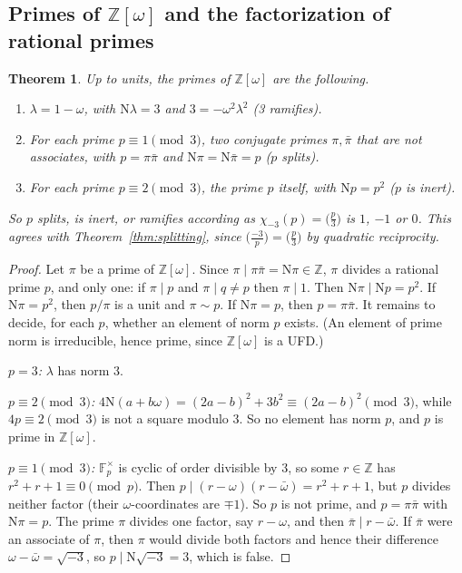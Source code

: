 \documentclass[11pt]{article}
\numberwithin{equation}{section}
\newcommand{\N}{\mathrm N}
\newcommand{\OO}{\mathbb Z[\omega]}
\newcommand{\Z}{\mathbb Z}
\newcommand{\F}{\mathbb F}
\newcommand{\ch}{\chi_{-3}}
\newtheorem{theorem}{Theorem}
\theoremstyle{definition}
\theoremstyle{remark}
\begin{document}
\subsection{Primes of \texorpdfstring{$\OO$}{Z[omega]} and the factorization of rational primes}\label{sec:primes}
\begin{theorem}\label{thm:primes}
Up to units, the primes of $\OO$ are the following.
\begin{enumerate}
\item $\lambda=1-\omega$, with $\N\lambda=3$ and $3=-\omega^2\lambda^2$ \emph{(3 ramifies)}.
\item For each prime $p\equiv1\pmod3$, two conjugate primes $\pi,\bar\pi$ that are not
associates, with $p=\pi\bar\pi$ and $\N\pi=\N\bar\pi=p$ \emph{($p$ splits)}.
\item For each prime $p\equiv2\pmod3$, the prime $p$ itself, with $\N p=p^2$ \emph{($p$ is inert)}.
\end{enumerate}
So $p$ splits, is inert, or ramifies according as $\ch(p)=\bigl(\frac p3\bigr)$ is $1$, $-1$
or $0$. This agrees with Theorem~\ref{thm:splitting}, since $\bigl(\frac{-3}p\bigr)=\bigl(\frac p3\bigr)$
by quadratic reciprocity.
\end{theorem}

\begin{proof}
Let $\pi$ be a prime of $\OO$. Since $\pi\mid\pi\bar\pi=\N\pi\in\Z$, $\pi$ divides a
rational prime $p$, and only one: if $\pi\mid p$ and $\pi\mid q\ne p$ then $\pi\mid1$. Then
$\N\pi\mid\N p=p^2$. If $\N\pi=p^2$, then $p/\pi$ is a unit and $\pi\sim p$. If $\N\pi=p$, then
$p=\pi\bar\pi$. It remains to decide, for each $p$, whether an element of norm $p$ exists.
(An element of prime norm is irreducible, hence prime, since $\OO$ is a UFD.)

\emph{$p=3$:} $\lambda$ has norm $3$.

\emph{$p\equiv2\pmod3$:} $4\N(a+b\omega)=(2a-b)^2+3b^2\equiv(2a-b)^2\pmod3$, while
$4p\equiv2\pmod 3$ is not a square modulo $3$. So no element has norm $p$, and $p$ is prime in $\OO$.

\emph{$p\equiv1\pmod3$:} $\F_p^\times$ is cyclic of order divisible by $3$, so some $r\in\Z$
has $r^2+r+1\equiv0\pmod p$. Then $p\mid(r-\omega)(r-\bar\omega)=r^2+r+1$, but $p$ divides
neither factor (their $\omega$-coordinates are $\mp1$). So $p$ is not prime, and $p=\pi\bar\pi$ with
$\N\pi=p$. The prime $\pi$ divides one factor, say $r-\omega$, and then $\bar\pi\mid r-\bar\omega$.
If $\bar\pi$ were an associate of $\pi$, then $\pi$ would divide both factors and hence
their difference $\omega-\bar\omega=\sqrt{-3}$, so $p\mid\N\sqrt{-3}=3$, which is false.
\end{proof}
\end{document}
